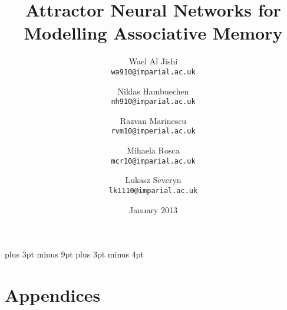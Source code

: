 \documentclass[11pt,a4paper,oneside]{report}
\title{Attractor Neural Networks for Modelling Associative Memory}
\date{January 2013}
\author{
  Wael Al Jishi\\
  \texttt{wa910@imparial.ac.uk}
  \and
  Niklas Hambuechen\\
  \texttt{nh910@imparial.ac.uk}
  \and
  Razvan Marinescu\\
  \texttt{rvm10@imperial.ac.uk}
  \and
  Mihaela Rosca\\
  \texttt{mcr10@imparial.ac.uk}
  \and
  Lukasz Severyn\\
  \texttt{lk1110@imparial.ac.uk}
}
\begin{document}
\belowdisplayskip=12pt plus 3pt minus 9pt
\belowdisplayshortskip=7pt plus 3pt minus 4pt







\maketitle{}


\renewcommand{\abstractname}{Executive Summary}



\tableofcontents



















\nocite{*} %





\chapter{Appendices}

\end{document}
